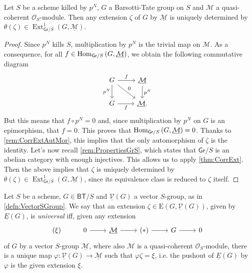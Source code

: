 \newpage
\begin{lem}\label{lem:rigidityExt}
	Let $S$ be a scheme killed by $p^N$, $G$ a Barsotti-Tate group on $S$
	and $\mathcal{M}$ a quasi-coherent $\mathcal{O}_S$-module.
	Then any extension $\zeta$ of $G$ by $\underline{\mathcal{M}}$ is
	uniquely determined by $\theta(\zeta) \in 
	\operatorname{Ext}^1_{\mathsf{Gr}/S}(G, \underline{\mathcal{M}})$.
\end{lem} 
\begin{proof}
	Since $p^N$ kills $S$, multiplication by $p^N$ 
	is the trivial map on $\mathcal{M}$.
	As a consequence, for all $f \in \operatorname{Hom}_{\mathsf{Gr}/S}
	\left( G, \underline{\mathcal{M}} \right)$,
	we obtain the following commutative diagram
	\begin{equation*}
	\begin{tikzcd}
		G \arrow[r, "f", rightarrow] 
		\arrow[d, "p^N"', rightarrow] 
		\arrow[rd, "0", rightarrow] &
		\underline{\mathcal{M}} \arrow[d, "p^N", rightarrow] \\
		G \arrow[r, "f"', rightarrow] &
		\underline{\mathcal{M}}
	.\end{tikzcd}
	\end{equation*}
	But this means that $f \circ p^N = 0$ and, since multiplication
	by $p^N$ on $G$ is an epimorphism, that $f = 0$.
	This proves that $\operatorname{Hom}_{ \mathsf{Gr}/S } \left( G, \underline{\mathcal{M}} \right) = 0$.
	Thanks to \cref{rem:CorrExtAutMor}, this implies that
	the only automorphism of $\zeta$ is the identity.
	Let's now recall \cref{rem:PropertiesGrS},
	which states that $\mathsf{Gr}/S$ is an abelian category with enough injectives.
	This allows us to apply \cref{thm:CorrExt}.
	Then the above implies that $\zeta$ is uniquely determined by $\theta(\zeta)
	\in \operatorname{Ext}^1_{\mathsf{Gr}/S}(G, \underline{\mathcal{M}})$,
	since its equivalence class is reduced to $\zeta$ itself.
\end{proof}


\begin{defn}
	Let $S$ be a scheme, $G \in \mathsf{BT}/S$
	and $\underline{\mathcal{V}}(G)$ a vector $S$-group,
	as in \cref{defn:VectorSGroup}.
	We say that an extension $\zeta \in \mathrm{E}(G, \underline{\mathcal{V}}(G))$, given
	by $\underline{E}(G)$, is \emph{universal} iff, given any extension
	\begin{equation*}
	\begin{tikzcd}
		(\xi) &
		0 \arrow[r, "", rightarrow] &
		\underline{\mathcal{M}} \arrow[r, "", rightarrow] &
		(*) \arrow[r, "", rightarrow] &
		G \arrow[r, "", rightarrow] &
		0
	\end{tikzcd}
	\end{equation*}
	of $G$ by a vector $S$-group $\underline{\mathcal{M}}$,
	where also $\mathcal{M}$ is a quasi-coherent $\mathcal{O}_{ S }$-module,
	there is a unique map $\varphi\colon \underline{\mathcal{V}}(G) \to \underline{\mathcal{M}}$
	such that $\varphi\zeta = \xi$, i.e. the pushout of
	$\underline{E}(G)$ by $\varphi$ is the given extension $\xi$.
\end{defn}


